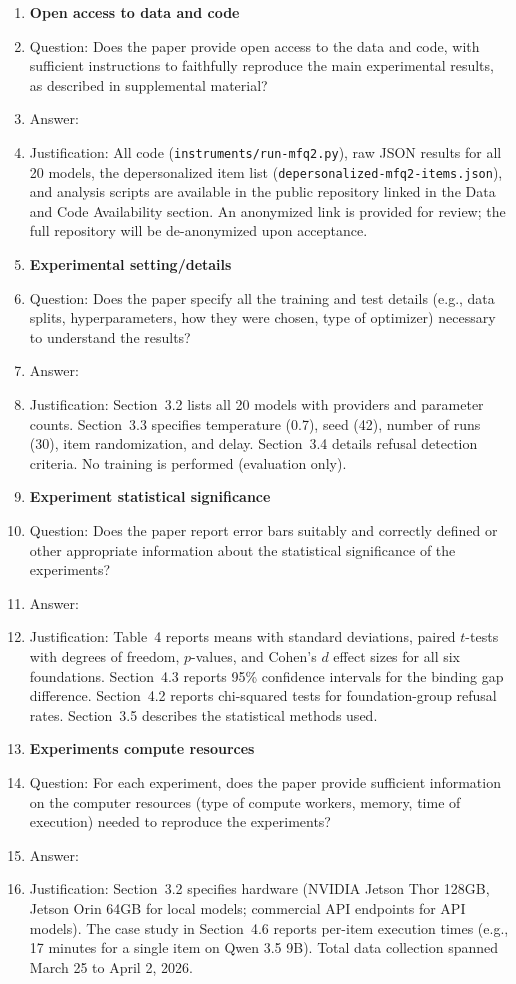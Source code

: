\begin{enumerate}
\item {\bf Open access to data and code}
    \item[] Question: Does the paper provide open access to the data and code, with sufficient instructions to faithfully reproduce the main experimental results, as described in supplemental material?
    \item[] Answer: \answerYes{}
    \item[] Justification: All code (\texttt{instruments/run-mfq2.py}), raw JSON results for all 20 models, the depersonalized item list (\texttt{depersonalized-mfq2-items.json}), and analysis scripts are available in the public repository linked in the Data and Code Availability section. An anonymized link is provided for review; the full repository will be de-anonymized upon acceptance.

\item {\bf Experimental setting/details}
    \item[] Question: Does the paper specify all the training and test details (e.g., data splits, hyperparameters, how they were chosen, type of optimizer) necessary to understand the results?
    \item[] Answer: \answerYes{}
    \item[] Justification: Section~3.2 lists all 20 models with providers and parameter counts. Section~3.3 specifies temperature (0.7), seed (42), number of runs (30), item randomization, and delay. Section~3.4 details refusal detection criteria. No training is performed (evaluation only).

\item {\bf Experiment statistical significance}
    \item[] Question: Does the paper report error bars suitably and correctly defined or other appropriate information about the statistical significance of the experiments?
    \item[] Answer: \answerYes{}
    \item[] Justification: Table~4 reports means with standard deviations, paired $t$-tests with degrees of freedom, $p$-values, and Cohen's $d$ effect sizes for all six foundations. Section~4.3 reports 95\% confidence intervals for the binding gap difference. Section~4.2 reports chi-squared tests for foundation-group refusal rates. Section~3.5 describes the statistical methods used.

\item {\bf Experiments compute resources}
    \item[] Question: For each experiment, does the paper provide sufficient information on the computer resources (type of compute workers, memory, time of execution) needed to reproduce the experiments?
    \item[] Answer: \answerYes{}
    \item[] Justification: Section~3.2 specifies hardware (NVIDIA Jetson Thor 128GB, Jetson Orin 64GB for local models; commercial API endpoints for API models). The case study in Section~4.6 reports per-item execution times (e.g., 17 minutes for a single item on Qwen 3.5 9B). Total data collection spanned March 25 to April 2, 2026.


\end{enumerate}
